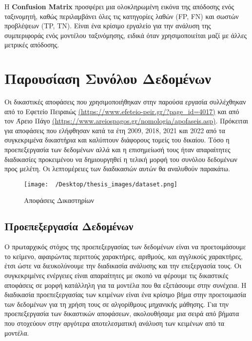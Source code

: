 \documentclass[diploma]{softlab-thesis}
\begin{document}
Η \textbf{Confusion Matrix} προσφέρει μια ολοκληρωμένη εικόνα της απόδοσης ενός ταξινομητή, καθώς περιλαμβάνει όλες τις κατηγορίες λαθών (FP, FN) και σωστών προβλέψεων (TP, TN). Είναι ένα κρίσιμο εργαλείο για την ανάλυση της συμπεριφοράς ενός μοντέλου ταξινόμησης, ειδικά όταν χρησιμοποιείται μαζί με άλλες μετρικές απόδοσης.



\chapter{Παρουσίαση Συνόλου Δεδομένων}

\sloppy
Οι δικαστικές αποφάσεις που χρησιμοποιήθηκαν στην παρούσα εργασία συλλέχθηκαν από το Εφετείο Πειραιώς \href{https://www.efeteio-peir.gr/?page\_id=4017}{(https://www.efeteio-peir.gr/?page\_id=4017)} και από τον Άρειο Πάγο \href{https://www.areiospagos.gr/nomologia/apofaseis.asp}{(https://www.areiospagos.gr/nomologia/apofaseis.asp)}. 
Πρόκειται για αποφάσεις που ελήφθησαν κατά τα έτη 2009, 2018, 2021 και 2022 από τα συγκεκριμένα δικαστήρια και καλύπτουν διάφορους τομείς του δικαίου. Τόσο η προεπεξεργασία των δεδομένων αλλά και η επισημείωσή τους ήταν απαραίτητες διαδικασίες προκειμένου να δημιουργηθεί η τελική μορφή του συνόλου δεδομένων προς μελέτη. Οι λεπτομέρειες των διαδικασιών αυτών θα αναλυθούν παρακάτω.

\begin{figure}[h]
    \centering
    \texttt{[image: ~/Desktop/thesis\_images/dataset.png]} %
    \caption{Αποφάσεις Δικαστηρίων}
    \label{fig:your_image_label}
\end{figure}



\section{Προεπεξεργασία Δεδομένων}

Ο πρωταρχικός στόχος της προεπεξεργασίας των δεδομένων είναι να προετοιμάσουμε το κείμενο, αφαιρώντας περιττούς χαρακτήρες, αριθμούς, και αγγλικούς χαρακτήρες, έτσι ώστε να διευκολύνουμε την διαδικασία ανάλυσης και την επεξεργασία τους. Οι συγκεκριμένες ενέργειες είναι απαραίτητες με σκοπό να φέρουμε τις δικαστικές αποφάσεις σε μορφή κατάλληλη για τα μοντέλα που θα εξετάσουμε στην συνέχεια. Η διαδικασία προεπεξεργασίας των κειμένων είναι ένα κρίσιμο βήμα στην προετοιμασία των δεδομένων για τη χρήση τους σε αλγορίθμους μηχανικής μάθησης. Για την προεπεξεργασία των δικαστικών αποφάσεων, ακολουθήσαμε μια σειρά από βήματα που στοχεύουν στην αργότερα αποτελεσματική ανάλυση των κειμένων από τα μοντέλα.
\end{document}
